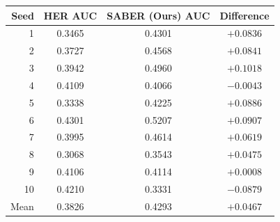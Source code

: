 \centering
\small
\setlength{\tabcolsep}{2.5pt}
\begin{tabular}{@{}rccc@{}}
\toprule
Seed & HER AUC & SABER (Ours) AUC & Difference \\
\midrule
1  & 0.3465 & 0.4301 & $+0.0836$ \\
2  & 0.3727 & 0.4568 & $+0.0841$ \\
3  & 0.3942 & 0.4960 & $+0.1018$ \\
4  & 0.4109 & 0.4066 & $-0.0043$ \\
5  & 0.3338 & 0.4225 & $+0.0886$ \\
6  & 0.4301 & 0.5207 & $+0.0907$ \\
7  & 0.3995 & 0.4614 & $+0.0619$ \\
8  & 0.3068 & 0.3543 & $+0.0475$ \\
9  & 0.4106 & 0.4114 & $+0.0008$ \\
10 & 0.4210 & 0.3331 & $-0.0879$ \\
\midrule
Mean & 0.3826 & 0.4293 & $+0.0467$ \\
\bottomrule
\end{tabular}
\label{tab:supp-fpp-td3-n10}
